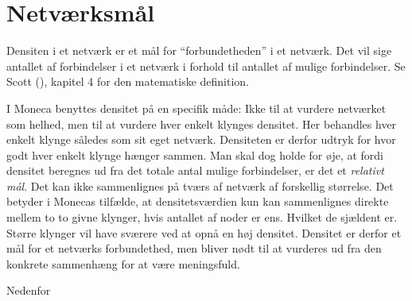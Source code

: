 
\newpage \chapter{Netværksmål \label{app_netvaerksmaal}}


Densiten i et netværk er et mål for “forbundetheden” i et netværk. Det vil sige antallet af forbindelser i et netværk i forhold til antallet af mulige forbindelser. Se Scott (\citeyear{Scott2000}), kapitel 4 for den matematiske definition. 

I Moneca benyttes densitet på en specifik måde: Ikke til at vurdere netværket som helhed, men til at vurdere hver enkelt klynges densitet. Her behandles hver enkelt klynge således som sit eget netværk. Densiteten er derfor udtryk for hvor godt hver enkelt klynge hænger sammen. Man skal dog holde for øje, at fordi densitet beregnes ud fra det totale antal mulige forbindelser, er det et \emph{relativt mål}. Det kan ikke sammenlignes på tværs af netværk af forskellig størrelse. Det betyder i Monecas tilfælde, at densitetsværdien kun kan sammenlignes direkte mellem to to givne klynger, hvis antallet af noder er ens. Hvilket de sjældent er. Større klynger vil have sværere ved at opnå en høj densitet. Densitet er derfor et mål for et netværks forbundethed, men bliver nødt til at vurderes ud fra den konkrete sammenhæng for at være meningsfuld. %

Nedenfor 


